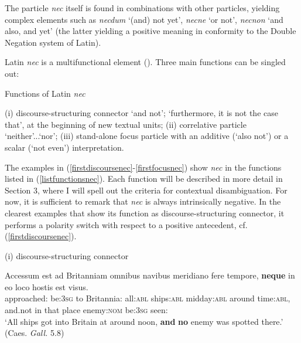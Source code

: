 \documentclass[output=paper,modfonts,nonflat,citecolor=brown,
showindex
]{langsci/langscibook}
\begin{document}
\noindent The particle {\emph{nec}} itself is found in combinations with other particles, yielding complex elements such as {\emph{necdum}} `(and) not yet', {\emph{necne}} `or not', {\emph{necnon}} `and also, and yet' (the latter yielding a positive meaning in conformity to the Double Negation system of Latin).

Latin {\emph{nec}} is a multifunctional element (\citealt[]{Orlandini01, OrlandiniPoccetti07}). Three main functions can be singled out:

{\begin{exe}
\ex \label{listfunctionsnec} Functions of Latin {\emph{nec}}
\begin{xlist}
\ex (i) discourse-structuring connector `and not'; `furthermore, it is not the case that', at the beginning of new textual units;
\ex (ii) correlative particle `neither'...`nor';
\ex (iii) stand-alone focus particle with an additive (`also not') or a scalar (`not even') interpretation.
\end{xlist}
\end{exe}}

\noindent The examples in (\ref{firstdiscoursenec}-\ref{firstfocusnec}) show {\emph{nec}} in the functions listed in (\ref{listfunctionsnec}). Each function will be described in more detail in Section 3, where I will spell out the criteria for contextual disambiguation. For now, it is sufficient to remark that {\emph{nec}} is always intrinsically negative. In the clearest examples that show its function as discourse-structuring connector, it performs a polarity switch with respect to a positive antecedent, cf. (\ref{firstdiscoursenec}).

{\begin{exe}
\ex (i) discourse-structuring connector

\label{firstdiscoursenec} \gll Accessum est ad Britanniam omnibus navibus meridiano fere tempore, {\textbf{neque}} in eo loco hostis est visus.\\
approached:{\ptcp} be:{\textsc{3sg}} to Britannia:{\acc} all:{\textsc{abl}} ships:{\textsc{abl}} midday:{\textsc{abl}} around time:{\textsc{abl}}, and.not in that place enemy:{\textsc{nom}} be:{\textsc{3sg}} seen:{\ptcp}\\

`All ships got into Britain at around noon, {\textbf{and}} {\textbf{no}} enemy was spotted there.' (Caes.{\emph{ Gall.}} 5.8)

\end{exe}}
\end{document}
